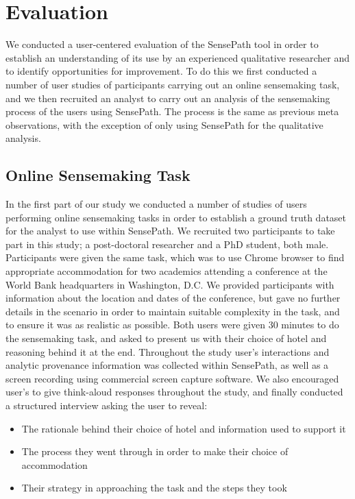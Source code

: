 \section{Evaluation}

We conducted a user-centered evaluation of the SensePath tool in order to establish an understanding of its use by an experienced qualitative researcher and to identify opportunities for improvement. To do this we first conducted a number of user studies of participants carrying out an online sensemaking task, and we then recruited an analyst to carry out an analysis of the sensemaking process of the users using SensePath. The process is the same as previous meta observations, with the exception of only using SensePath for the qualitative analysis.

\subsection{Online Sensemaking Task}
In the first part of our study we conducted a number of studies of users performing online sensemaking tasks in order to establish a ground truth dataset for the analyst to use within SensePath. We recruited two participants to take part in this study; a post-doctoral researcher and a PhD student, both male. Participants were given the same task, which was to use Chrome browser to find appropriate accommodation for two academics attending a conference at the World Bank headquarters in Washington, D.C. We provided participants with information about the location and dates of the conference, but gave no further details in the scenario in order to maintain suitable complexity in the task, and to ensure it was as realistic as possible. Both users were given 30 minutes to 	do the sensemaking task, and asked to present us with their choice of hotel and reasoning behind it at the end. Throughout the study user's interactions and analytic provenance information was collected within SensePath, as well as a screen recording using commercial screen capture software. We also encouraged user's to give think-aloud responses throughout the study, and finally conducted a structured interview asking the user to reveal:

\begin{itemize}
	\item The rationale behind their choice of hotel and information used to support it
	\item The process they went through in order to make their choice of accommodation
	\item Their strategy in approaching the task and the steps they took
\end{itemize}

